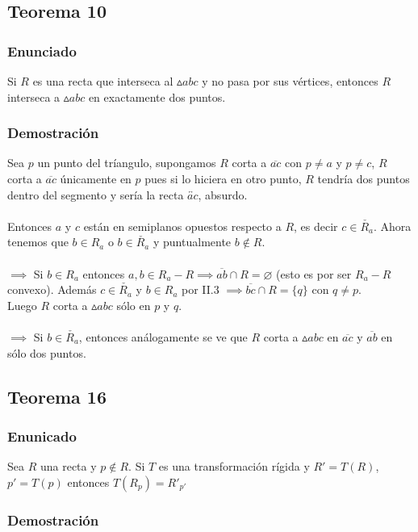 \documentclass[a4paper]{article}
\begin{document}
\subsection{Teorema 10}
\subsubsection{Enunciado}
Si $R$ es una recta que interseca al $\vartriangle abc$ y no pasa por sus vértices, entonces $R$ interseca a $\vartriangle abc$ en exactamente dos puntos.
\subsubsection{Demostración}
Sea $p$ un punto del tríangulo, supongamos $R$ corta a $\overline{ac}$ con $p\neq a$ y $p\neq c$, $R$ corta a $\overline{ac}$ únicamente en $p$ pues si lo hiciera en otro punto, $R$ tendría dos puntos dentro del segmento y sería la recta $\overleftrightarrow{ac}$, absurdo.\\\\
Entonces $a$ y $c$ están en semiplanos opuestos respecto a $R$, es decir $c \in \check{R_a}$. Ahora tenemos que $b \in R_a$ o $b \in \check{R_a}$ y puntualmente $b \notin R$.\\\\
$\implies$ Si $b \in R_a$ entonces $a,b \in R_a - R \implies \overline{ab} \cap R = \varnothing$ (esto es por ser $R_a - R$ convexo). Además $c \in \check{R_a}$ y $b \in R_a$ por II.3 $\implies \overline{bc} \cap R = \{q\}$ con $q\neq p$.\\
Luego $R$ corta a $\vartriangle abc$ sólo en $p$ y $q$.\\\\
$\implies$ Si $b \in \check{R_a}$, entonces análogamente se ve que $R$ corta a $\vartriangle abc$ en $\overline{ac}$ y $\overline{ab}$ en sólo dos puntos.

\subsection{Teorema 16}
\subsubsection{Enunicado}
Sea $R$ una recta y $p \notin R$. Si $T$ es una transformación rígida y $R'=T(R)$, $p'=T(p)$ entonces $T(R_p)=R'_{p'}$

\subsubsection{Demostración}
\end{document}
